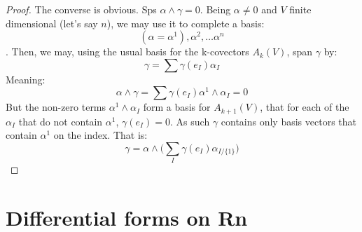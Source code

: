 \begin{problem}
\end{problem}

\begin{proof}
	The converse is obvious. Sps $\alpha \wedge \gamma = 0$. Being $\alpha \neq 0$ and $V$ finite dimensional (let's say $n$), we may use it to complete a basis:
	$$(\alpha = \alpha^1), \alpha^2, \dots \alpha^n$$. Then, we may, using the usual basis for the k-covectors $A_k(V)$, span $\gamma$ by:
	$$\gamma = \sum \gamma(e_I)\alpha_I$$
	Meaning:
	$$\alpha \wedge \gamma = \sum \gamma(e_I) \alpha^1 \wedge \alpha_I = 0$$
	But the non-zero terms $\alpha^1 \wedge \alpha_I$ form a basis for $A_{k+1}(V)$, that for each of the $\alpha_I$ that do not contain
	$\alpha^1$, $\gamma(e_I) = 0$. As such $\gamma$ contains only basis vectors that contain $\alpha^1$ on the index. That is:
	$$\gamma = \alpha \wedge \Bigg( \sum_{I} \gamma(e_I) \alpha_{I / \{ 1\}} \Bigg)$$
\end{proof}

\section{Differential forms on Rn}

